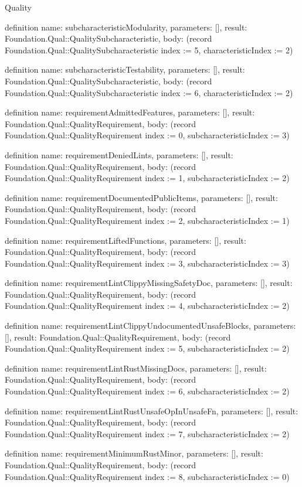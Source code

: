 \begin{lexlean}{Quality}
\begin{semanticmodule}
definition{
  name: subcharacteristicModularity,
  parameters: [],
  result: Foundation.Qual::QualitySubcharacteristic,
  body: (record Foundation.Qual::QualitySubcharacteristic {index := 5, characteristicIndex := 2})
}

definition{
  name: subcharacteristicTestability,
  parameters: [],
  result: Foundation.Qual::QualitySubcharacteristic,
  body: (record Foundation.Qual::QualitySubcharacteristic {index := 6, characteristicIndex := 2})
}

definition{
  name: requirementAdmittedFeatures,
  parameters: [],
  result: Foundation.Qual::QualityRequirement,
  body: (record Foundation.Qual::QualityRequirement {index := 0, subcharacteristicIndex := 3})
}

definition{
  name: requirementDeniedLints,
  parameters: [],
  result: Foundation.Qual::QualityRequirement,
  body: (record Foundation.Qual::QualityRequirement {index := 1, subcharacteristicIndex := 2})
}

definition{
  name: requirementDocumentedPublicItems,
  parameters: [],
  result: Foundation.Qual::QualityRequirement,
  body: (record Foundation.Qual::QualityRequirement {index := 2, subcharacteristicIndex := 1})
}

definition{
  name: requirementLiftedFunctions,
  parameters: [],
  result: Foundation.Qual::QualityRequirement,
  body: (record Foundation.Qual::QualityRequirement {index := 3, subcharacteristicIndex := 3})
}

definition{
  name: requirementLintClippyMissingSafetyDoc,
  parameters: [],
  result: Foundation.Qual::QualityRequirement,
  body: (record Foundation.Qual::QualityRequirement {index := 4, subcharacteristicIndex := 2})
}

definition{
  name: requirementLintClippyUndocumentedUnsafeBlocks,
  parameters: [],
  result: Foundation.Qual::QualityRequirement,
  body: (record Foundation.Qual::QualityRequirement {index := 5, subcharacteristicIndex := 2})
}

definition{
  name: requirementLintRustMissingDocs,
  parameters: [],
  result: Foundation.Qual::QualityRequirement,
  body: (record Foundation.Qual::QualityRequirement {index := 6, subcharacteristicIndex := 2})
}

definition{
  name: requirementLintRustUnsafeOpInUnsafeFn,
  parameters: [],
  result: Foundation.Qual::QualityRequirement,
  body: (record Foundation.Qual::QualityRequirement {index := 7, subcharacteristicIndex := 2})
}

definition{
  name: requirementMinimumRustMinor,
  parameters: [],
  result: Foundation.Qual::QualityRequirement,
  body: (record Foundation.Qual::QualityRequirement {index := 8, subcharacteristicIndex := 0})
}


\end{semanticmodule}
\end{lexlean}
